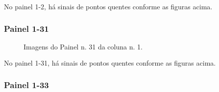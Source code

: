 \documentclass[dvipsnames]{article}%
\begin{document}
%
\FloatBarrier%
No painel 1{-}2, há sinais de pontos quentes conforme as figuras acima.\newline%
%
\subsubsection{Painel 1-31}%


\begin{figure}[h!]%
\centering%
%
\hfill%
%
\hfill%
%
\caption{Imagens do Painel n. 31 da coluna n. 1.}%
\end{figure}

%
\FloatBarrier%
No painel 1{-}31, há sinais de pontos quentes conforme as figuras acima.\newline%
%
\subsubsection{Painel 1-33}%
\end{document}
